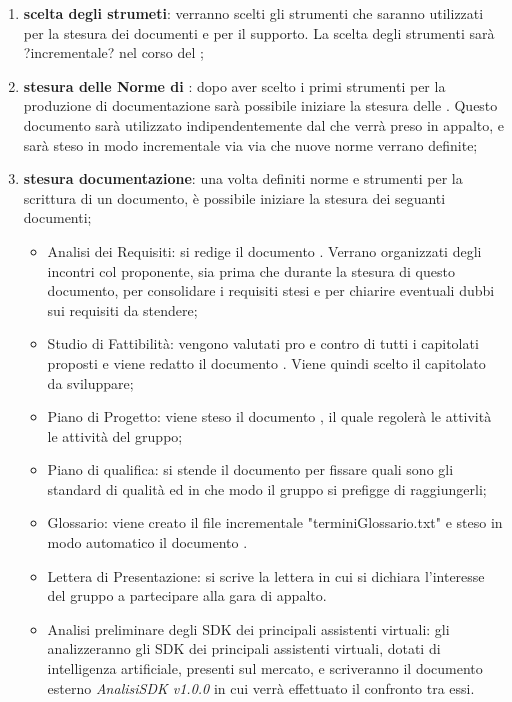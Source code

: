 \documentclass[./PianoDiProgetto.tex]{subfiles}
\begin{document}
  \begin{enumerate}
		\item \textbf{scelta degli strumeti}: verranno scelti gli strumenti che saranno utilizzati per la stesura dei documenti e per il supporto. La scelta degli strumenti sarà ?incrementale? nel corso del ;
		\item \textbf{stesura delle Norme di }: dopo aver scelto i primi strumenti per la produzione di documentazione sarà possibile iniziare la stesura delle \NPdocRR. Questo documento sarà utilizzato indipendentemente dal  che verrà preso in appalto, e sarà steso in modo incrementale via via che nuove norme verrano definite;
		\item \textbf{stesura documentazione}: una volta definiti norme e strumenti per la scrittura di un documento, è possibile iniziare la stesura dei seguanti documenti;
    \begin{itemize}
      \item Analisi dei Requisiti: si redige il documento \ARdocRR. Verrano organizzati degli incontri col proponente, sia prima che durante la stesura di questo documento, per consolidare i requisiti stesi e per chiarire eventuali dubbi sui requisiti da stendere;
      \item Studio di Fattibilità: vengono valutati pro e contro di tutti i capitolati proposti e viene redatto il documento \SFdocRR. Viene quindi scelto il capitolato da sviluppare;
      \item Piano di Progetto: viene steso il documento \PPdocRR, il quale regolerà le attività le attività del gruppo;
      \item Piano di qualifica: si stende il documento \PQdocRR per fissare quali sono gli standard di qualità ed in che modo il gruppo si prefigge di raggiungerli;
      \item Glossario: viene creato il file incrementale "terminiGlossario.txt" e steso in modo automatico il documento \GldocRR.
      \item Lettera di Presentazione: si scrive la lettera in cui si dichiara l'interesse del gruppo a partecipare alla gara di appalto.
      \item Analisi preliminare degli SDK dei principali assistenti virtuali: gli \ANP{} analizzeranno gli SDK dei principali assistenti virtuali, dotati di intelligenza artificiale, presenti sul mercato, e scriveranno il documento esterno \textit{AnalisiSDK v1.0.0} in cui verrà effettuato il confronto tra  essi.
    \end{itemize}
  \end{enumerate}
  \newpage
\end{document}
